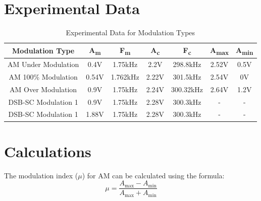\documentclass[12pt]{article}
\begin{document}
\section*{Experimental Data}
\begin{table}[H]
    \centering
    \begin{tabular}{|c|c|c|c|c|c|c|}
        \hline
        \textbf{Modulation Type} & \textbf{A\textsubscript{m}} & \textbf{F\textsubscript{m}} & \textbf{A\textsubscript{c}} & \textbf{F\textsubscript{c}} & \textbf{A\textsubscript{max}} & \textbf{A\textsubscript{min}} \\
        \hline
        AM Under Modulation      & 0.4V                        & 1.75kHz                     & 2.2V                        & 298.8kHz                    & 2.52V                         & 0.5V                          \\
        \hline
        AM 100\% Modulation      & 0.54V                       & 1.762kHz                    & 2.22V                       & 301.5kHz                    & 2.54V                         & 0V                            \\
        \hline
        AM Over Modulation       & 0.9V                        & 1.75kHz                     & 2.24V                       & 300.32kHz                   & 2.64V                         & 1.2V                          \\
        \hline
        DSB-SC Modulation 1      & 0.9V                        & 1.75kHz                     & 2.28V                       & 300.3kHz                    & -                             & -                             \\
        \hline
        DSB-SC Modulation 1      & 1.88V                       & 1.75kHz                     & 2.28V                       & 300.3kHz                    & -                             & -                             \\
        \hline
    \end{tabular}
    \caption{Experimental Data for Modulation Types}
    \label{tab:experimental_data}
\end{table}

\section*{Calculations}
The modulation index (\( \mu \)) for AM can be calculated using the formula:
\[
    \mu = \frac{A_{\text{max}} - A_{\text{min}}}{A_{\text{max}} + A_{\text{min}}}
\]
\end{document}
